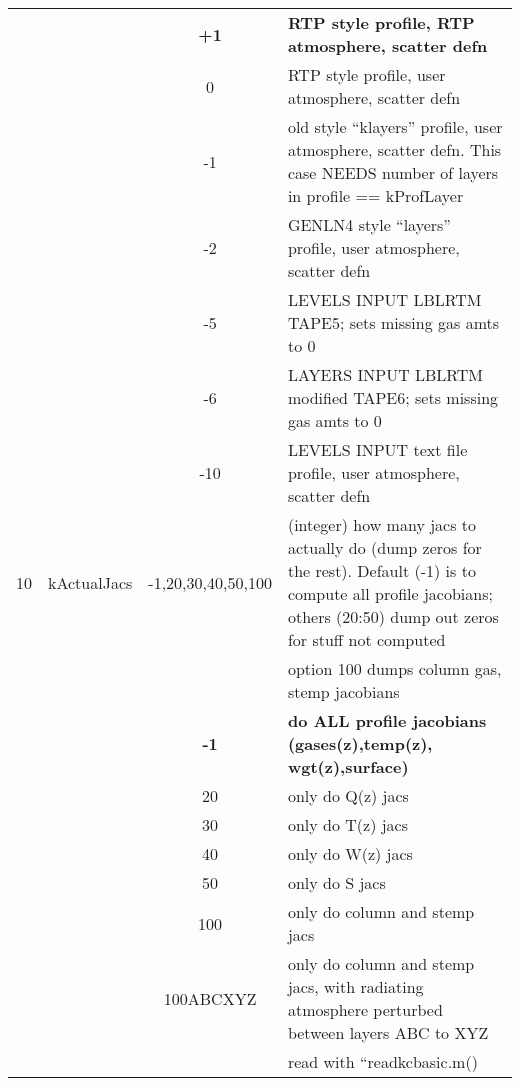 \documentclass[12pt]{article}
\newlength{\colwidth}
\newlength{\colwidthshort}
\begin{document}
\begin{small}
\begin{longtable}{|c|c|c|p{\colwidthshort}|}
  &              & {\bf +1}  & {\bf RTP style profile, RTP atmosphere, 
                                scatter defn}\\
  &              & {0}       & RTP style profile, user atmosphere, 
                                scatter defn\\
  &              & {-1}      & old style ``klayers'' profile, user 
                                 atmosphere, scatter defn. This case NEEDS 
                                 number of layers in profile == kProfLayer\\
  &              & {-2}      & GENLN4 style ``layers'' profile, user 
                                 atmosphere, scatter defn\\ 
  &              & {-5}     & LEVELS INPUT LBLRTM TAPE5; sets missing gas amts to 0\\
  &              & {-6}     & LAYERS INPUT LBLRTM modified TAPE6; sets missing gas amts to 0\\
  &              & {-10}     & LEVELS INPUT text file profile, user 
                                 atmosphere, scatter defn\\ \hline
10 & {\sf kActualJacs}  & -1,20,30,40,50,100  & (integer) how many jacs to 
  actually do (dump zeros for the rest). Default (-1) is to compute all 
  profile jacobians; others (20:50) dump out zeros for stuff not computed\\
  &              &           & option 100 dumps column gas, stemp jacobians \\
  &              & {\bf -1}  &{\bf do ALL profile jacobians (gases(z),temp(z),
                               wgt(z),surface)}\\
  &              & {20}        & only do Q(z) jacs\\
  &              & {30}        & only do T(z) jacs\\
  &              & {40}        & only do W(z) jacs\\
  &              & {50}        & only do S jacs\\   
  &              & {100}       & only do column and stemp jacs\\
  &              & {100ABCXYZ} & only do column and stemp jacs, with 
                   radiating atmosphere perturbed between layers ABC to XYZ\\
  &              &             &  read with ``readkcbasic.m()\\   \hline
  \hline
\end{longtable}
\end{small}
\end{document}

